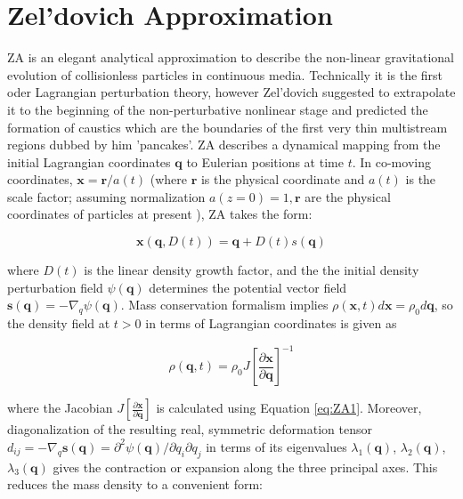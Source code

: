 \section{Zel'dovich Approximation}

\label{sec:ZA}

ZA is an elegant analytical approximation to describe the non-linear gravitational evolution of collisionless particles in continuous media. Technically it is the first oder Lagrangian perturbation theory, however Zel'dovich suggested to extrapolate it to the beginning of the non-perturbative nonlinear stage and predicted the formation of caustics which are the boundaries of
the first very thin multistream regions dubbed by him  'pancakes'.
ZA describes a dynamical mapping from the initial Lagrangian coordinates $\mathbf{q}$ to Eulerian positions at time $t$. In co-moving coordinates, $\mathbf{x} = \mathbf{r}/a(t)$ (where $\mathbf{r}$ is the physical coordinate  and $a(t)$ is the scale factor; assuming normalization $a(z=0)=1, \mathbf{r}$ are 
the physical coordinates of particles at present ), ZA takes the form:

\begin{equation} \label{eq:ZA1}
 \mathbf{x}(\mathbf{q}, D(t) ) = \mathbf{q} + D(t) s(\mathbf{q}) 
\end{equation}

where $D(t)$ is the linear density growth factor, and the the initial density perturbation field $\psi(\mathbf{q})$ determines the potential vector field $\mathbf{s(q)} = - \nabla_q \psi(\mathbf{q})$. 
Mass conservation formalism implies $\rho(\mathbf{x}, t) d\mathbf{x} = \rho_0 d\mathbf{q} $, so the density field at $t>0$ in terms of Lagrangian coordinates is given as 

\begin{equation}
 \rho(\mathbf{q}, t) = \rho_0 J \left[ \frac{\partial\mathbf{x}}{\partial\mathbf{q}} \right]^{-1}
\end{equation}

where the Jacobian $J \left[ \frac{\partial\mathbf{x}}{\partial\mathbf{q}} \right]$ is calculated using Equation \ref{eq:ZA1}. Moreover, diagonalization of the resulting real, symmetric deformation tensor $d_{ij} = - \nabla_q \mathbf{s(q)} =  \partial^2 \psi(\mathbf{q})/ \partial q_i \partial q_j$ in terms of its eigenvalues $\lambda_1(\mathbf{q})$, $\lambda_2(\mathbf{q})$, $\lambda_3(\mathbf{q})$ gives the contraction or expansion along the three principal axes. This reduces the mass density to a convenient form:

